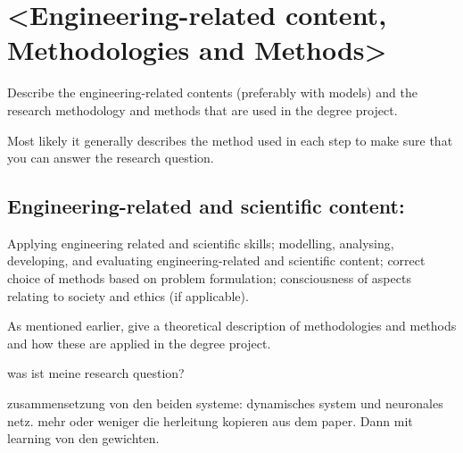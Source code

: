 \chapter{<Engineering-related content, Methodologies and Methods>}

Describe the engineering-related contents (preferably with models) and the research methodology and methods that are used in the degree project.

Most likely it generally describes the method used in each step to make sure that you can answer the research question.

\section{Engineering-related and scientific content:}
Applying engineering related and scientific skills; modelling, analysing, developing, and evaluating engineering-related and scientific content; correct choice of methods based on problem formulation; consciousness of aspects relating to society and ethics (if applicable).

As mentioned earlier, give a theoretical description of methodologies and methods and how these are applied in the degree project.


was ist meine research question?

zusammensetzung von den beiden systeme: dynamisches system und neuronales netz. mehr oder weniger die herleitung kopieren aus dem paper. Dann mit learning von den gewichten.
